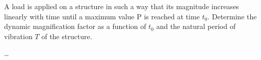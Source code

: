 
\begin{Exercise}[label=ramp_force]
A load is applied on a structure in such a way that its magnitude increases linearly with time until a maximum value P is reached at time $t_0$. Determine the dynamic magnification factor as a function of $t_0$ and the natural period of vibration $T$ of the structure.

\begin{center}
\end{center}

\shortAnswer \dots
\end{Exercise}



